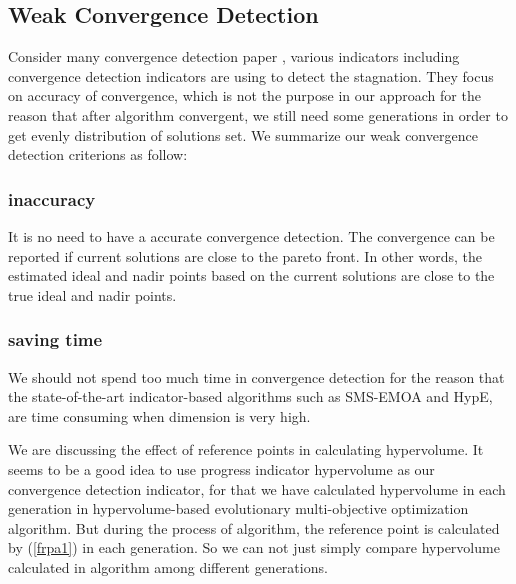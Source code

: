 \documentclass[conference]{IEEEtran}
\begin{document}
\subsection{Weak Convergence Detection}
Consider many convergence detection paper \cite{convergenceDetection},
various indicators including convergence detection indicators are using to detect the stagnation.
They focus on accuracy of convergence, which is not the purpose in our approach for 
the reason that after algorithm convergent, we still need some generations in order to
get evenly distribution of solutions set. 
We summarize our weak convergence detection criterions as follow:
\subsubsection{inaccuracy} It is no need to have a accurate convergence detection. 
The convergence can be reported if current solutions are close to the pareto front.
In other words, the estimated ideal and nadir points based on the current solutions
are close to the true ideal and nadir points. 
\subsubsection{saving time} We should not spend too much time in convergence detection
for the reason that the state-of-the-art indicator-based algorithms such as SMS-EMOA and HypE, 
are time consuming when dimension is very high. 

We are discussing the effect of reference points in calculating hypervolume. It seems to be a good
idea to use progress indicator hypervolume as our convergence detection indicator, 
for that we have calculated
hypervolume in each generation in hypervolume-based evolutionary multi-objective optimization algorithm.
But during the process of algorithm, the reference point is calculated by (\ref{frpa1}) 
in each generation.
So we can not just simply compare hypervolume calculated in algorithm among different generations. 
\end{document}
